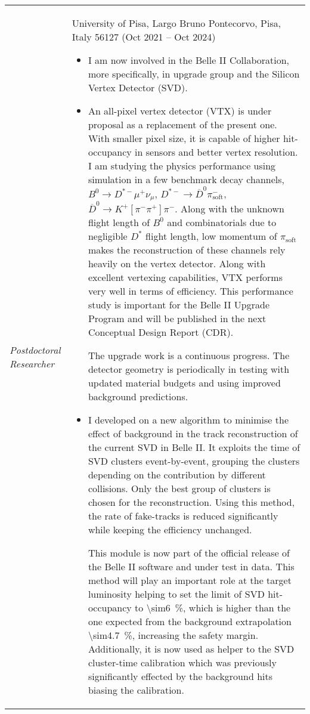 \documentclass[12pt]{article}
\begin{document}
\begin{minipage}{1.05\textwidth}
\vspace{0.4cm}
\begin{tabular}{p{2.5cm} p{14.5cm} }
  {\emph{Postdoctoral Researcher}} & University of Pisa, Largo Bruno Pontecorvo, Pisa, Italy 56127 (Oct 2021 -- Oct 2024)

  \begin{itemize}
  \item I am now involved in the Belle II Collaboration, more
    specifically, in upgrade group and the Silicon Vertex Detector (SVD).
  \item An all-pixel vertex detector (VTX) is under proposal as a replacement of
    the present one. With smaller pixel size, it is capable of higher
    hit-occupancy in sensors and better vertex resolution.
    I am studying the physics performance using simulation in a
    few benchmark decay channels, $B^{0} \rightarrow D^{*-}\mu^{+}\nu_{\mu}$,
    $D^{*-} \rightarrow \overline{D}^{0} \pi^{-}_{\text{soft}}$,
    $\overline{D}^{0} \rightarrow K^{+}[\pi^{-}\pi^{+}]\pi^{-}$.
    Along with the unknown flight length of $B^0$ and combinatorials due to
    negligible $D^{*}$ flight length, low momentum of $\pi_{\text{soft}}$ makes
    the reconstruction of these channels rely heavily on the vertex
    detector. Along with excellent vertexing capabilities, VTX performs very well
    in terms of efficiency. 
    This performance study is important for the Belle II Upgrade Program and will be
    published in the next Conceptual Design Report (CDR).

    The upgrade work is a continuous progress. The detector geometry is
    periodically in testing with updated material budgets and using improved
    background predictions. 

  \item I developed on a new algorithm to minimise the effect of background in the
    track reconstruction of the current SVD in Belle II.
    It exploits the time of SVD clusters event-by-event, grouping the clusters
    depending on the contribution by different collisions.
    Only the best group of
    clusters is chosen for the reconstruction. Using this method,
    the rate of fake-tracks is reduced significantly while keeping the efficiency
    unchanged.

    This module is now part of the official release of the Belle II software and under
    test in data.
    This method will play an important role at the target luminosity helping to set the limit
    of SVD hit-occupancy to \SI{\sim6}{\%}, which is higher than the one expected from the background
    extrapolation \SI{\sim4.7}{\%}, increasing the safety margin. Additionally, it is now
    used as helper to the SVD cluster-time calibration which was previously significantly effected
    by the background hits biasing the calibration.


\end{itemize}
\end{tabular}
\end{minipage}
\end{document}
